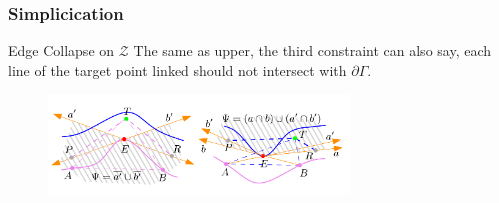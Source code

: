 \documentclass{beamer}
\begin{document}
\begin{frame}
\frametitle{Simplicication}
\begin{block}{Edge Collapse on $\mathcal{Z}$}
The same as upper, the third constraint can also say, each line of the target point linked should not intersect with $\partial \Gamma$.
\end{block}
\begin{figure}[h]
  \includegraphics[width=8cm]{ec_z}
\end{figure}
\end{frame}

\end{document}
